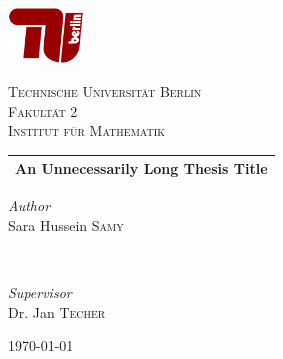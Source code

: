 \documentclass[12pt,a4paper]{article}
\theoremstyle{definition}
\theoremstyle{remark}
\begin{document}
\color{RichBlack}


\begin{titlepage}
\newcommand{\HRule}{\rule{\linewidth}{0.5mm}}
\begin{center}

\includegraphics[width=0.15\textwidth]{TU-Berlin-Logo.png}\\[1cm]
\begin{otherlanguage}{german}
\textsc{\LARGE Technische Universit\"at Berlin}\\[1.5cm]
\textsc{\large Fakult\"at 2}\\[0.5cm]
\textsc{\large Institut f\"ur Mathematik}\\[0.5cm]
\end{otherlanguage}

\setlength{\aboverulesep}{10pt}
\setlength{\belowrulesep}{13pt}
\begin{tabularx}{\textwidth}{ >{\centering\arraybackslash}X}
\midrule[0.5mm]
\huge\bfseries An Unnecessarily Long Thesis Title\\
\midrule[0.5mm]
\end{tabularx}

\begin{minipage}{0.4\textwidth}
    \begin{flushleft}
        \large
        \textit{\textcolor{TUColor}{Author}}\\
        Sara Hussein \textsc{Samy}
    \end{flushleft}
\end{minipage}
~
\begin{minipage}{0.4\textwidth}
    \begin{flushright}
        \large
        \textit{\textcolor{TUColor}{Supervisor}}\\
        Dr. Jan \textsc{Techer}
    \end{flushright}
\end{minipage}

\vspace{260 pt}
{\large\today}
\end{center}
\end{titlepage}
\end{document}

